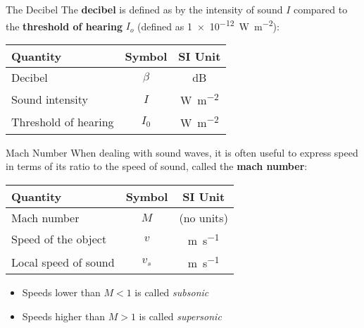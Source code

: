 \documentclass[12pt,aspectratio=169]{beamer}
\newcommand{\eq}[2]{\vspace{#1}{\Large\begin{displaymath}#2\end{displaymath}}}
\begin{document}
\begin{frame}{The Decibel}
  The \textbf{decibel} is defined as by the intensity of sound $I$ compared to
  the \textbf{threshold of hearing} $I_o$ (defined as
  \SI{1e-12}{\watt\per\metre\squared}):
  
  \eq{-.2in}{
    \boxed{\beta=10\log_{10}\left[\frac{I}{I_0}\right]}
  }
  \begin{center}
    \begin{tabular}{l|c|c}
      \rowcolor{pink}
      \textbf{Quantity} & \textbf{Symbol} & \textbf{SI Unit} \\ \hline
      Decibel              & $\beta$ & \si{dB}\\
      Sound intensity      & $I$     & \si{\watt\per\metre\squared}\\
      Threshold of hearing & $I_0$   & \si{\watt\per\metre\squared}
    \end{tabular}
  \end{center}  
  
\end{frame}



\begin{frame}{Mach Number}
  When dealing with sound waves, it is often useful to express speed in terms
  of its ratio to the speed of sound, called the \textbf{mach number}:
  
  \eq{-.2in}{
    \boxed{M=\frac{v}{v_s}}
  }
  \begin{center}
    \begin{tabular}{l|c|c}
      \rowcolor{pink}
      \textbf{Quantity} & \textbf{Symbol} & \textbf{SI Unit} \\ \hline
      Mach number          & $M$   & (no units) \\
      Speed of the object  & $v$   & \si{\metre\per\second}\\
      Local speed of sound & $v_s$ & \si{\metre\per\second}
    \end{tabular}
  \end{center}
  \begin{itemize}
  \item Speeds lower than $M<1$ is called \emph{subsonic}
  \item Speeds higher than $M>1$ is called \emph{supersonic}
  \end{itemize}
\end{frame}
\end{document}
